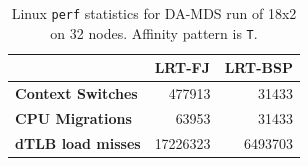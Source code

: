 \documentclass[10pt, conference, compsocconf]{IEEEtran}
\begin{document}
\begin{table}[]
\centering
\caption{Linux \texttt{perf} statistics for \ac{DA-MDS} run of 18x2 on 32 nodes. Affinity pattern is \texttt{T}.}
\label{tbl:perf-stats}
\setlength\extrarowheight{4pt}
\begin{tabular}{l|r|r|}
\cline{2-3}
                                                & \multicolumn{1}{l|}{\textbf{LRT-FJ}} & \multicolumn{1}{l|}{\textbf{LRT-BSP}} \\ \hline
\multicolumn{1}{|l|}{\textbf{Context Switches}} & 477913                               & 31433                                 \\ \hline
\multicolumn{1}{|l|}{\textbf{CPU Migrations}}   & 63953                                & 31433                                 \\ \hline
\multicolumn{1}{|l|}{\textbf{dTLB load misses}} & 17226323                             & 6493703                               \\ \hline
\end{tabular}
\end{table}
\end{document}

